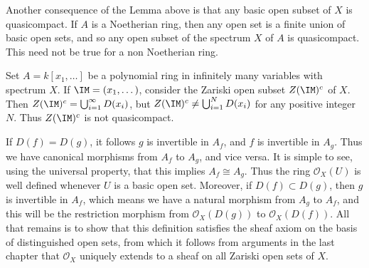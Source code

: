 Another consequence of the Lemma above is that any basic open subset of $X$ is quasicompact. If $A$ is a Noetherian ring, then any open set is a finite union of basic open sets, and so any open subset of the spectrum $X$ of $A$ is quasicompact. This need not be true for a non Noetherian ring.

\begin{example}
    Set $A = k[x_1,\dots]$ be a polynomial ring in infinitely many variables with spectrum $X$. If $\IM = (x_1,\dots)$, consider the Zariski open subset $Z(\IM)^c$ of $X$. Then $Z(\IM)^c = \bigcup_{i = 1}^\infty D(x_i)$, but $Z(\IM)^c \neq \bigcup_{i = 1}^N D(x_i)$ for any positive integer $N$. Thus $Z(\IM)^c$ is not quasicompact.
\end{example}

If $D(f) = D(g)$, it follows $g$ is invertible in $A_f$, and $f$ is invertible in $A_g$. Thus we have canonical morphisms from $A_f$ to $A_g$, and vice versa. It is simple to see, using the universal property, that this implies $A_f \cong A_g$. Thus the ring $\mathcal{O}_X(U)$ is well defined whenever $U$ is a basic open set. Moreover, if $D(f) \subset D(g)$, then $g$ is invertible in $A_f$, which means we have a natural morphism from $A_g$ to $A_f$, and this will be the restriction morphism from $\mathcal{O}_X(D(g))$ to $\mathcal{O}_X(D(f))$. All that remains is to show that this definition satisfies the sheaf axiom on the basis of distinguished open sets, from which it follows from arguments in the last chapter that $\mathcal{O}_X$ uniquely extends to a sheaf on all Zariski open sets of $X$.

